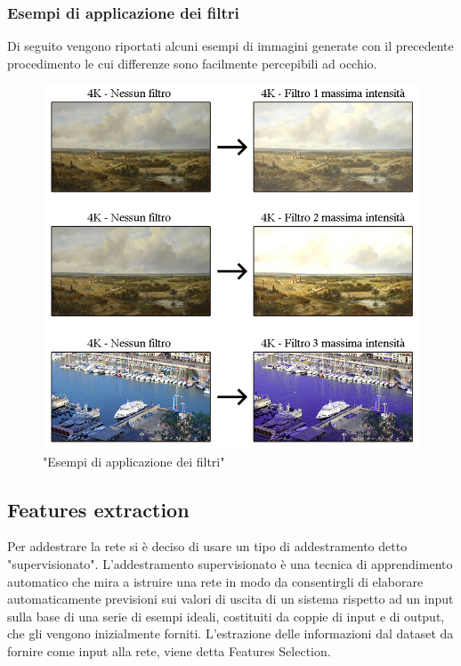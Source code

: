 \documentclass[a4paper,11pt]{article}
\begin{document}
    \subsubsection{Esempi di applicazione dei filtri}
    Di seguito vengono riportati alcuni esempi di immagini generate con il precedente procedimento le cui differenze sono facilmente percepibili ad occhio.
    \begin{figure}[h]
        \centering
        \includegraphics[scale=0.45]{filtri}
        \caption{"Esempi di applicazione dei filtri"}
    \end{figure}


    \newpage
    
    \subsection{Features extraction}
    Per addestrare la rete si è deciso di usare un tipo di addestramento detto "supervisionato". 
    L'addestramento supervisionato è una tecnica di apprendimento automatico che mira a istruire una rete in modo da consentirgli di elaborare automaticamente previsioni sui valori di uscita di un sistema rispetto 
    ad un input sulla base di una serie di esempi ideali, costituiti da coppie di input e di output, che gli vengono inizialmente forniti. L'estrazione delle informazioni dal dataset da fornire come input alla rete, viene detta Features Selection.
    
\end{document}
